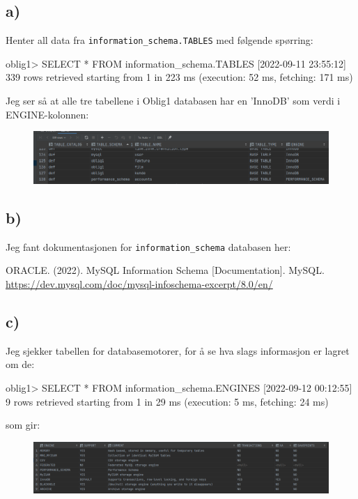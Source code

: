 \documentclass[%
notitlepage,
 amsmath,amssymb,
 aps,
rmp,
]{revtex4-2}  %
\begin{document}
\subsection*{a)}
Henter all data fra \verb+information_schema.TABLES+ med følgende spørring:
\begin{sql}
oblig1> SELECT *
        FROM information_schema.TABLES
[2022-09-11 23:55:12] 339 rows retrieved starting from 1 in 223 ms (execution: 52 ms, fetching: 171 ms)
\end{sql}
Jeg ser så at alle tre tabellene i Oblig1 databasen har en 'InnoDB' som verdi i ENGINE-kolonnen:
\begin{figure}[H]
\centering\includegraphics[width=\columnwidth]{op4a.png}
\end{figure}

\subsection*{b)}
Jeg fant dokumentasjonen for \verb+information_schema+ databasen her:

ORACLE. (2022). MySQL Information Schema [Documentation]. MySQL. \url{https://dev.mysql.com/doc/mysql-infoschema-excerpt/8.0/en/}

\subsection*{c)}
Jeg sjekker tabellen for databasemotorer, for å se hva slags informasjon er lagret om de:
\begin{sql}
oblig1> SELECT *
        FROM information_schema.ENGINES
[2022-09-12 00:12:55] 9 rows retrieved starting from 1 in 29 ms (execution: 5 ms, fetching: 24 ms)
\end{sql}
som gir:
\begin{figure}[H]
\centering\includegraphics[width=\columnwidth]{op4c1.png}
\end{figure}
\end{document}
